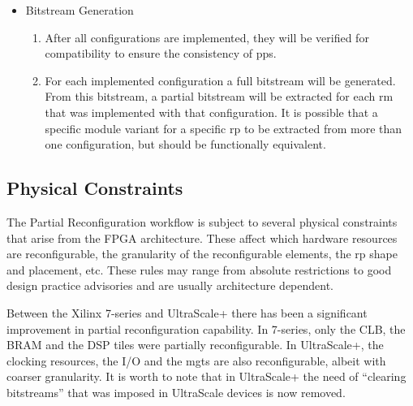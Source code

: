\begin{itemize}
\begin{enumerate}
		reconfigurable domains. These sites will be locked and all subsequent 
		\gls{rm} implementations will be constrained to respect them.
		Therefore the initial configuration must be chosen carefully,
		as a bad choice may render some \gls{rm} variants unroutable for some \glspl{rp}.
		It is recommended to begin with the configuration that contains the
		most difficult to route \gls{rm} variant of each \gls{rp}.
		In order to find a \gls{pp} set that permits the routing of all module variants,
		some trial and error is unavoidable.
	\item	All subsequent configurations import the static part of previous step
		and implement their \gls{rm} variants within its context.
	\end{enumerate}
\item	Bitstream Generation
	\begin{enumerate}
	\item	After all configurations are implemented, they will be verified for compatibility
		to ensure the consistency of \glspl{pp}.
	\item	For each implemented configuration a full bitstream will be generated.
		From this bitstream, a partial bitstream will be extracted for each \gls{rm}
		that was implemented with that configuration.
		It is possible that a specific module variant for a specific \gls{rp}
		to be extracted from more than one configuration, 
		but should be functionally equivalent.
	\end{enumerate}
\end{itemize}

\subsection{Physical Constraints}
\label{sec:pr-phys}

The Partial Reconfiguration workflow is subject to several physical constraints that
arise from the FPGA architecture. These affect which hardware resources are reconfigurable,
the granularity of the reconfigurable elements, the \gls{rp} shape and placement, etc.
These rules may range from absolute restrictions to good design practice advisories
and are usually architecture dependent.

Between the Xilinx 7-series and UltraScale+ there has been a significant improvement
in partial reconfiguration capability. In 7-series, only the CLB, the BRAM and the DSP tiles
were partially reconfigurable. In UltraScale+, the clocking resources, the I/O and the
\glspl{mgt} are also reconfigurable, albeit with coarser granularity. 
It is worth to note that in UltraScale+ the need of ``clearing bitstreams'' that
was imposed in UltraScale devices is now removed.

